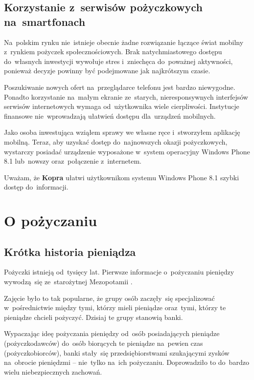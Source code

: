\documentclass[a4paper,twoside,titlepage,openright]{book}
\begin{document}
\section*{Korzystanie z~serwisów pożyczkowych na~smartfonach}

Na~polskim rynku nie~istnieje obecnie żadne rozwiązanie łączące świat mobilny z~rynkiem pożyczek społecznościowych. Brak natychmiastowego dostępu do~własnych inwestycji wywołuje stres i~zniechęca do~poważnej aktywności, ponieważ decyzje powinny być podejmowane jak najkrótszym czasie. 

Poszukiwanie nowych ofert na~przeglądarce telefonu jest bardzo niewygodne. Ponadto korzystanie na~małym ekranie ze~starych, nieresponsywnych interfejsów serwisów internetowych wymaga od~użytkownika wiele cierpliwości. Instytucje finansowe nie~wprowadzają ułatwień dostępu dla~urządzeń mobilnych. 

Jako osoba inwestująca wziąłem sprawy we własne ręce i~stworzyłem aplikację mobilną. Teraz, aby uzyskać dostęp do~najnowszych okazji pożyczkowych, wystarczy posiadać urządzenie wyposażone w~system operacyjny Windows Phone 8.1 lub~nowszy oraz~połączenie z~internetem.

Uważam, że \textbf{Kopra} ułatwi użytkownikom systemu Windows Phone 8.1 szybki dostęp do~informacji.


\clearpage{\pagestyle{empty}\cleardoublepage}

\chapter{O pożyczaniu}
\section{Krótka historia pieniądza}
Pożyczki istnieją od~tysięcy lat. Pierwsze informacje o~pożyczaniu pieniędzy wywodzą~się ze~starożytnej Mezopotamii \cite{financingCivilization}. 

Zajęcie było to tak popularne, że grupy osób zaczęły~się specjalizować w~pośrednictwie między tymi, którzy mieli pieniądze oraz~tymi, którzy te pieniądze chcieli pożyczyć. Dzisiaj te grupy stanowią banki. 

Wypaczając ideę pożyczania pieniędzy od~osób posiadających pieniądze (pożyczkodawców) do~osób biorących te pieniądze na~pewien czas (pożyczkobiorców), banki stały~się przedsiębiorstwami szukającymi zysków na~obrocie pieniędzmi -- nie~tylko na~ich pożyczaniu. Doprowadziło to do~bardzo wielu niebezpiecznych zachowań. 
\end{document}
